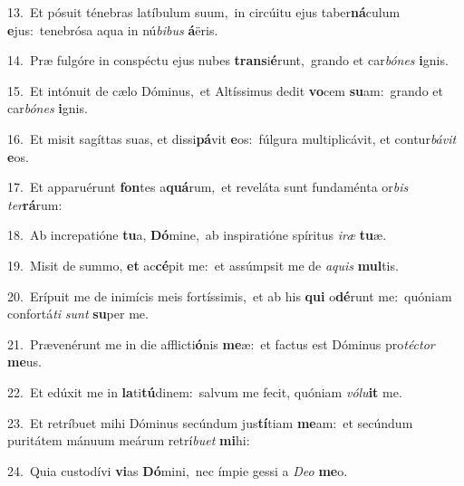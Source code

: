 {\numbfont\textcolor{\numbcolor}{13.}}~Et pósuit ténebras latíbulum suum,~\dagger in circúitu ejus taber\-\textbf{ná}\-culum \textbf{e}\-jus:~\star tenebrósa aqua in nú\-\textit{bi}\-\textit{bus} \textbf{á}\-ëris.\par
{\numbfont\textcolor{\numbcolor}{14.}}~Præ fulgóre in conspéctu ejus nubes \textbf{trans}\-i\-\textbf{é}\-runt,~\star grando et car\-\textit{bó}\-\textit{nes} \textbf{i}\-gnis.\par
{\numbfont\textcolor{\numbcolor}{15.}}~Et intónuit de cælo Dóminus,~\dagger et Altíssimus dedit \textbf{vo}\-cem \textbf{su}\-am:~\star grando et car\-\textit{bó}\-\textit{nes} \textbf{i}\-gnis.\par
{\numbfont\textcolor{\numbcolor}{16.}}~Et misit sagíttas suas, et dissi\-\textbf{pá}\-vit \textbf{e}\-os:~\star fúlgura multiplicávit, et contur\-\textit{bá}\-\textit{vit} \textbf{e}\-os.\par
{\numbfont\textcolor{\numbcolor}{17.}}~Et apparuérunt \textbf{fon}\-tes a\-\textbf{quá}\-rum,~\star et reveláta sunt fundaménta or\textit{bis} \textit{ter}\-\textbf{rá}rum:\par
{\numbfont\textcolor{\numbcolor}{18.}}~Ab increpatióne \textbf{tu}\-a, \textbf{Dó}\-mine,~\star ab inspiratióne spíritus \textit{i}\-\textit{ræ} \textbf{tu}\-æ.\par
{\numbfont\textcolor{\numbcolor}{19.}}~Misit de summo, \textbf{et} ac\-\textbf{cé}\-pit me:~\star et assúmpsit me de \textit{a}\-\textit{quis} \textbf{mul}\-tis.\par
{\numbfont\textcolor{\numbcolor}{20.}}~Erípuit me de inimícis meis fortíssimis,~\dagger et ab his \textbf{qui} o\-\textbf{dé}\-runt me:~\star quóniam confortá\textit{ti} \textit{sunt} \textbf{su}\-per me.\par
{\numbfont\textcolor{\numbcolor}{21.}}~Prævenérunt me in die afflicti\-\textbf{ó}\-nis \textbf{me}\-æ:~\star et factus est Dóminus pro\-\textit{téc}\-\textit{tor} \textbf{me}\-us.\par
{\numbfont\textcolor{\numbcolor}{22.}}~Et edúxit me in \textbf{la}\-ti\-\textbf{tú}\-dinem:~\star salvum me fecit, quóniam \textit{vó}\-\textit{lu}\textbf{it} me.\par
{\numbfont\textcolor{\numbcolor}{23.}}~Et retríbuet mihi Dóminus secúndum jus\-\textbf{tí}\-tiam \textbf{me}\-am:~\star et secúndum puritátem mánuum meárum retrí\-\textit{bu}\-\textit{et} \textbf{mi}\-hi:\par
{\numbfont\textcolor{\numbcolor}{24.}}~Quia custodívi \textbf{vi}\-as \textbf{Dó}\-mini,~\star nec ímpie gessi a \textit{De}\-\textit{o} \textbf{me}\-o.\par
